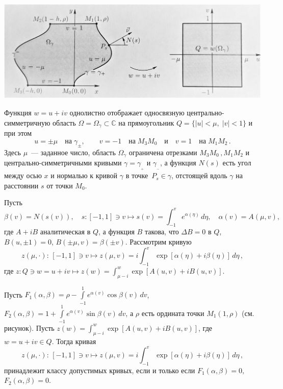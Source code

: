 \includegraphics[width=16cm]{Demidov_picture_graph_2}

Функция $w=u+iv$ однолистно отображает односвязную
центрально-симметричную область 
$\Omega=\Omega_{\gamma}\subset\mathbb{C}$
на прямоугольник $Q=\{|u|<\mu, \;|v|<1\}$ и при этом
\begin{equation*}
\label{extr6.1}
 u=\pm \mu \quad \mbox{на}\; \gamma_\pm, \qquad  v=-1
\quad \mbox{на}\; M_3M_0\quad \mbox{и}  \quad v=1 \quad
\mbox{на}\; M_1M_2 \,.
\end{equation*}
Здесь $\mu$~--- заданное число, область
$\Omega_{\gamma}$ ограничена отрезками $M_{3}M_{0}\, , M_{1}M_{2}$
и центрально-симметричными кривыми $\gamma=\gamma_{_+}$ и $\gamma_{_-}$, а 
функция $N(s)$ есть угол между осью $x$ и нормалью к кривой $\gamma$ в 
точке~$P_s\in \gamma$, отстоящей вдоль $\gamma$ на расстоянии $s$ от точки $M_0$.

Пусть 
\begin{equation}
\label{e8}  \beta(v) = N(s(v)), \quad
 s : \left[-1,1\right]\ni v\mapsto s(v) = \int_{-1}^v e^{\alpha(\eta)}\, d\eta,\quad
 \alpha(v)=A(\mu,v),
\end{equation}
где $A+iB$ аналитическая в $Q$, а функция $B$ такова, что $\Delta B = 0$
в $Q$, $B(u,\pm 1)=0$, $B(\pm \mu,v)=\beta(\pm v)$. 
Рассмотрим кривую
\begin{equation}
\label{zmu}
 z(\mu,\cdot ): \, \left[-1,1\right]\ni v \mapsto z(\mu,v)=
i \int_{-1}^v
\exp\left[{\alpha}(\eta)+i{\beta}(\eta)\right]\,d\eta\,,
\end{equation}
где $z: Q\ni w=u+iv \mapsto z(w)=\int_{\mu-i}^w \exp \left[
A(u,v)+iB(u,v) \right]$.
\begin{lemma}
Пусть $F_1(\alpha,\beta){=}\rho - \int\limits_{-1}^1 e^{\alpha(v)}
\cos\beta(v)\,dv$, $F_2(\alpha,\beta){=}1+
\int\limits_{-1}^1 e^{\alpha(v)} \sin\beta(v)\,dv$,
а $\rho$ есть ордината точки $M_1(1,\rho)$ (см. рисунок). Пусть
$z(w)=\int_{\mu-i}^w \exp \left[ A(u,v)+iB(u,v) \right]$, где $w=u+iv\in Q$. 
Тогда кривая
\begin{equation}
\label{zmu}
 z(\mu,\cdot ): \, \left[-1,1\right]\ni v \mapsto z(\mu,v)=
i \int_{-1}^v
\exp\left[{\alpha}(\eta)+i{\beta}(\eta)\right]\,d\eta\,,
\end{equation}
принадлежит классу допустимых кривых,
если и только если 
 $F_1(\alpha,\beta)=0,$ $F_2(\alpha,\beta)=0.$
\end{lemma}

